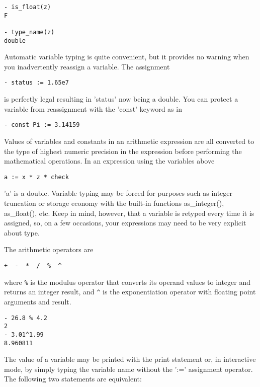 \begin{verbatim}
- is_float(z)
F

- type_name(z)
double 
\end{verbatim}

    Automatic variable typing is quite convenient, but it provides no
warning when you inadvertently reassign a variable.  The assignment

\begin{verbatim}
- status := 1.65e7
\end{verbatim}

is perfectly legal resulting in 'status' now being a double.  You can
protect a variable from reassignment with the 'const' keyword as in

\begin{verbatim}
- const Pi := 3.14159
\end{verbatim}

    Values of variables and constants in an arithmetic expression are all
converted to the type of highest numeric precision in the expression before
performing the mathematical operations.  In an expression using the
variables above

\begin{verbatim}
a := x * z * check
\end{verbatim}

'a' is a double.  Variable typing may be forced for purposes such as
integer truncation or storage economy with the built-in functions
as\_integer(), as\_float(), etc.  Keep in mind, however, that a variable is
retyped every time it is assigned, so, on a few occasions, your expressions
may need to be very explicit about type.

    The arithmetic operators are

\begin{verbatim}
+  -  *  /  %  ^
\end{verbatim}

where \verb!%! is the modulus operator that converts its operand values to integer
and returns an integer result, and \verb!^! is the exponentiation operator with
floating point arguments and result.

\begin{verbatim}
- 26.8 % 4.2
2
- 3.01^1.99
8.960811
\end{verbatim}

    The value of a variable may be printed with the print statement or, in
interactive mode, by simply typing the variable name without the ':='
assignment operator.  The following two statements are equivalent:

